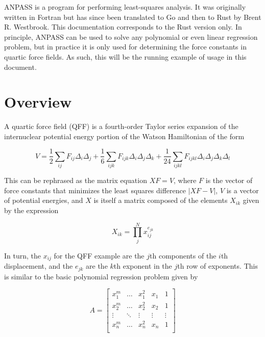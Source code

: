 \documentclass{article}
\begin{document}
ANPASS is a program for performing least-squares analysis. It was originally
written in Fortran but has since been translated to Go and then to Rust by Brent
R. Westbrook. This documentation corresponds to the Rust version only. In
principle, ANPASS can be used to solve any polynomial or even linear regression
problem, but in practice it is only used for determining the force constants in
quartic force fields. As such, this will be the running example of usage in this
document.

\section{Overview}
\label{sec:over}

A quartic force field (QFF) is a fourth-order Taylor series expansion of the
internuclear potential energy portion of the Watson Hamiltonian of the form

\begin{equation}
  V = \frac{1}{2}\sum_{ij} F_{ij}\Delta_i\Delta_j +
  \frac{1}{6}\sum_{ijk} F_{ijk}\Delta_i\Delta_j \Delta_k+
  \frac{1}{24}\sum_{ijkl} F_{ijkl}\Delta_i\Delta_j\Delta_k\Delta_l
\end{equation}

This can be rephrased as the matrix equation $XF=V$, where $F$ is the vector of
force constants that minimizes the least squares difference $|XF - V|$, $V$ is a
vector of potential energies, and $X$ is itself a matrix composed of the
elements $X_{ik}$ given by the expression

\begin{equation}
  X_{ik} = \prod_j^N x_{ij}^{e_{jk}}
\end{equation}

In turn, the $x_{ij}$ for the QFF example are the $j$th components of the $i$th
displacement, and the $e_{jk}$ are the $k$th exponent in the $j$th row of
exponents. This is similar to the basic polynomial regression problem given by

\begin{equation}
  A =
  \begin{bmatrix}
    x_1^m & \dots & x_1^2 & x_1 & 1 \\
    x_2^m & \dots & x_2^2 & x_2 & 1 \\
    \vdots & \ddots & \vdots & \vdots & \vdots \\
    x_n^m & \dots & x_n^2 & x_n & 1 \\
  \end{bmatrix}
\end{equation}
\end{document}
